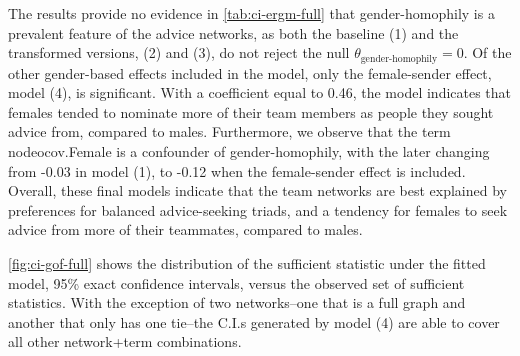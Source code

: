 \documentclass[review, nonatbib,doubleblind]{elsarticle/elsarticle}
\begin{document}
The results provide no evidence in \autoref{tab:ci-ergm-full} that gender-homophily is a prevalent feature of the advice networks, as both the baseline (1) and the transformed versions, (2) and (3), do not reject the null $\theta_{\text{gender-homophily}} = 0$. Of the other gender-based effects included in the model, only the female-sender effect, model (4), is significant. With a coefficient equal to 0.46, the model indicates that females tended to nominate more of their team members as people they sought advice from, compared to males. Furthermore, we observe that the term nodeocov.Female is a confounder of gender-homophily, with the later changing from -0.03 in model (1), to -0.12 when the female-sender effect is included. Overall, these final models indicate that the team networks are best explained by preferences for balanced advice-seeking triads, and a tendency for females to seek advice from more of their teammates, compared to males. 

\autoref{fig:ci-gof-full} shows the distribution of the sufficient statistic under the fitted model, 95\% exact confidence intervals, versus the observed set of sufficient statistics. With the exception of two networks--one that is a full graph and another that only has one tie--the C.I.s generated by model (4) are able to cover all other network+term combinations.
\end{document}

